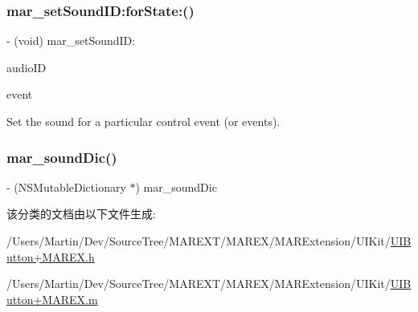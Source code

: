 \subsubsection{\texorpdfstring{mar\+\_\+set\+Sound\+I\+D\+:for\+State\+:()}{mar\_setSoundID:forState:()}}
{\footnotesize\ttfamily -\/ (void) mar\+\_\+set\+Sound\+I\+D\+: \begin{DoxyParamCaption}\item[{(M\+A\+R\+Audio\+ID)}]{audio\+ID }\item[{forState:(U\+I\+Control\+Events)}]{event }\end{DoxyParamCaption}}

Set the sound for a particular control event (or events). \mbox{\label{category_u_i_button_07_m_a_r_e_x_08_a18818ff6ae140137bf37b9f5ee2783d4}} 
\subsubsection{\texorpdfstring{mar\+\_\+sound\+Dic()}{mar\_soundDic()}}
{\footnotesize\ttfamily -\/ (N\+S\+Mutable\+Dictionary $\ast$) mar\+\_\+sound\+Dic \begin{DoxyParamCaption}{ }\end{DoxyParamCaption}\hspace{0.3cm}{\ttfamily [implementation]}}



该分类的文档由以下文件生成\+:\begin{DoxyCompactItemize}
\item 
/\+Users/\+Martin/\+Dev/\+Source\+Tree/\+M\+A\+R\+E\+X\+T/\+M\+A\+R\+E\+X/\+M\+A\+R\+Extension/\+U\+I\+Kit/\hyperlink{_u_i_button_09_m_a_r_e_x_8h}{U\+I\+Button+\+M\+A\+R\+E\+X.\+h}\item 
/\+Users/\+Martin/\+Dev/\+Source\+Tree/\+M\+A\+R\+E\+X\+T/\+M\+A\+R\+E\+X/\+M\+A\+R\+Extension/\+U\+I\+Kit/\hyperlink{_u_i_button_09_m_a_r_e_x_8m}{U\+I\+Button+\+M\+A\+R\+E\+X.\+m}\end{DoxyCompactItemize}
